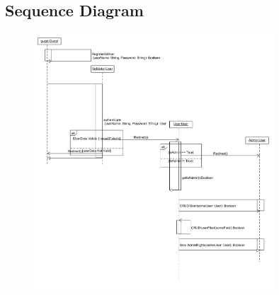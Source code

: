 \subsection{Sequence Diagram}
\begin{figure}[!htbp]
	\includegraphics[width=0.8\textwidth]{User_Management/Sequence_Diagram_User_Management.png}
\end{figure}


